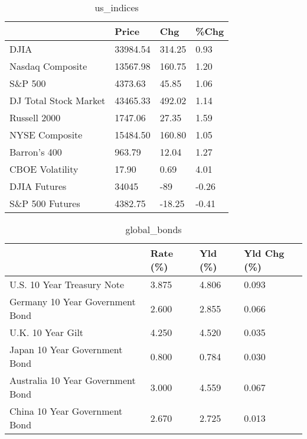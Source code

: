 \documentclass{article}%
\begin{document}
%


\begin{table}[htbp]%
\caption{us\_indices}%
\centering%
\begin{adjustbox}{width=1\textwidth}%
\begin{tabular}{llll}
\toprule
                      &    Price &    Chg &  \%Chg \\
\midrule
                 DJIA & 33984.54 & 314.25 &  0.93 \\
     Nasdaq Composite & 13567.98 & 160.75 &  1.20 \\
              S\&P 500 &  4373.63 &  45.85 &  1.06 \\
DJ Total Stock Market & 43465.33 & 492.02 &  1.14 \\
         Russell 2000 &  1747.06 &  27.35 &  1.59 \\
       NYSE Composite & 15484.50 & 160.80 &  1.05 \\
         Barron's 400 &   963.79 &  12.04 &  1.27 \\
      CBOE Volatility &    17.90 &   0.69 &  4.01 \\
         DJIA Futures &    34045 &    -89 & -0.26 \\
      S\&P 500 Futures &  4382.75 & -18.25 & -0.41 \\
\bottomrule
\end{tabular}
%
\end{adjustbox}%
\end{table}

%


\begin{table}[htbp]%
\caption{global\_bonds}%
\centering%
\begin{adjustbox}{width=1\textwidth}%
\begin{tabular}{llll}
\toprule
                                  & Rate (\%) & Yld (\%) & Yld Chg (\%) \\
\midrule
       U.S. 10 Year Treasury Note &    3.875 &   4.806 &       0.093 \\
  Germany 10 Year Government Bond &    2.600 &   2.855 &       0.066 \\
                U.K. 10 Year Gilt &    4.250 &   4.520 &       0.035 \\
    Japan 10 Year Government Bond &    0.800 &   0.784 &       0.030 \\
Australia 10 Year Government Bond &    3.000 &   4.559 &       0.067 \\
    China 10 Year Government Bond &    2.670 &   2.725 &       0.013 \\
\bottomrule
\end{tabular}
%
\end{adjustbox}%
\end{table}
\end{document}
